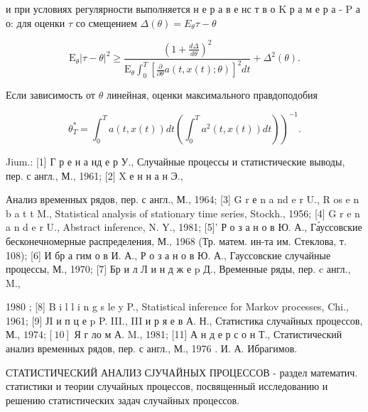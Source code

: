 \documentclass[10pt]{article}
\begin{document}
и при условиях регулярности выполняется н е р а в е нс т в о K р а м е р а - $\mathrm{P}$ а о: для оценки $\tau$ со смещением $\Delta(\theta)=E_{\theta} \tau-\theta$



\[

\mathrm{E}_{\theta}|\tau-\theta|^{2} \geqslant \frac{\left(1+\frac{d \Delta}{d \theta}\right)^{2}}{\mathrm{E}_{\theta} \int_{0}^{T}\left[\frac{\partial}{\partial \theta} a(t, x(t) ; \theta)\right]^{2} d t}+\Delta^{2}(\theta) .

\]



Если зависимость от $\theta$ линейная, оценки максимального правдоподобия



\[

\left.\theta_{T}^{*}=\int_{0}^{T} a(t, x(t)) d t\left(\int_{0}^{T} a^{2}(t, x(t)) d t\right)\right)^{-1} .

\]



Jium.: [1] Г р е н а нд е р У., Случайные процессы и статистические выводы, пер. с англ., М., 1961; [2] X е н н а н Э.,

Анализ временных рядов, пер. с англ., М., 1964; [3] G r е n a nd e r U., R os e n b a t t M., Statistical analysis of stationary time series, Stockh., 1956; [4] G r e n a n d e r U., Abstract inference, N. Y., 1981; [5]' Р о з а н о в Ю. А., Га́уссовские бесконечномерные распределения, М., 1968 (Тр. матем. ин-та им. Стеклова, т. 108); [6] И бр а гим о в И. А., Р о з а н о в Ю. А., Гауссовские случайные процессы, М., 1970; [7] Бр и л Л и н д ж е p Д., Временные ряды, пер. c англ., M.,

1980 ; [8] B i l l i n g s le y P., Statistical inference for Markov processes, Chi., 1961; [9] ЈI и п ц е p P. III., III и р я е в А. Н., Статистика случайных процессов, М., $1974 ;[10]$ Я г ло м А. M., 1981; [11] А н д е р с о н Т., Статистический анализ временных рядов, пер. с англ., М., 1976 . И. А. Ибрагимов.



СТАТИСТИЧЕСКИЙ АНАЛИЗ СЈУЧАЙНЫХ ПРОЦЕССОВ - раздел математич. статистики и теории случайных процессов, посвященный исследованию и решению статистических задач случайных процессов.
\end{document}
